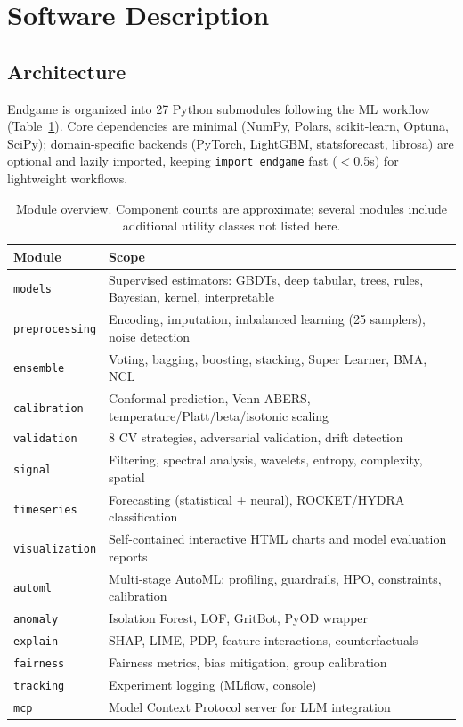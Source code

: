\documentclass[11pt]{article}
\begin{document}
\section{Software Description}
\label{sec:software}

\subsection{Architecture}

Endgame is organized into 27 Python submodules following the ML workflow
(Table~\ref{tab:modules}). Core dependencies are minimal (NumPy, Polars,
scikit-learn, Optuna, SciPy); domain-specific backends (PyTorch, LightGBM,
statsforecast, librosa) are optional and lazily imported, keeping
\texttt{import endgame} fast ($<$0.5s) for lightweight workflows.

\begin{table}[h]
\centering
\caption{Module overview. Component counts are approximate; several modules
  include additional utility classes not listed here.}
\label{tab:modules}
\small
\begin{tabular}{@{}ll@{}}
\toprule
\textbf{Module} & \textbf{Scope} \\
\midrule
\texttt{models}        & Supervised estimators: GBDTs, deep tabular, trees, rules, Bayesian, kernel, interpretable \\
\texttt{preprocessing} & Encoding, imputation, imbalanced learning (25 samplers), noise detection \\
\texttt{ensemble}      & Voting, bagging, boosting, stacking, Super Learner, BMA, NCL \\
\texttt{calibration}   & Conformal prediction, Venn-ABERS, temperature/Platt/beta/isotonic scaling \\
\texttt{validation}    & 8 CV strategies, adversarial validation, drift detection \\
\texttt{signal}        & Filtering, spectral analysis, wavelets, entropy, complexity, spatial \\
\texttt{timeseries}    & Forecasting (statistical + neural), ROCKET/HYDRA classification \\
\texttt{visualization} & Self-contained interactive HTML charts and model evaluation reports \\
\texttt{automl}        & Multi-stage AutoML: profiling, guardrails, HPO, constraints, calibration \\
\texttt{anomaly}       & Isolation Forest, LOF, GritBot, PyOD wrapper \\
\texttt{explain}       & SHAP, LIME, PDP, feature interactions, counterfactuals \\
\texttt{fairness}      & Fairness metrics, bias mitigation, group calibration \\
\texttt{tracking}      & Experiment logging (MLflow, console) \\
\texttt{mcp}           & Model Context Protocol server for LLM integration \\
\bottomrule
\end{tabular}
\end{table}
\end{document}
